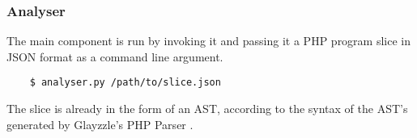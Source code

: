 \subsubsection*{Analyser}
\label{sec:expr.analyser}

The main component is run by invoking it and passing it a PHP program slice in
JSON format as a command line argument.

\begin{verbatim}
    $ analyser.py /path/to/slice.json
\end{verbatim}

The slice is already in the form of an AST, according to the syntax of the AST's
generated by Glayzzle's PHP Parser \cite{glayzzle-php}.
